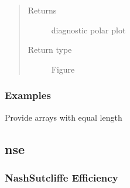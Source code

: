 \documentclass[letterpaper,10pt,english]{sphinxmanual}
\begin{document}
\begin{fulllineitems}
\begin{quote}
\begin{description}
\begin{itemize}
\end{itemize}

\item[{Returns}] \leavevmode
{} \textendash{} diagnostic polar plot

\item[{Return type}] \leavevmode
Figure

\end{description}\end{quote}
\subsubsection*{Examples}

Provide arrays with equal length

\begin{sphinxVerbatim}[commandchars=\\\{\}]
   
   
  \PYG{p}{[}     \PYG{p}{]}
  \PYG{p}{[}     \PYG{p}{]}
 
\end{sphinxVerbatim}

\end{fulllineitems}



\subsection{nse}
\label{\detokenize{reference/nse:nse}}\label{\detokenize{reference/nse::doc}}

\subsubsection{Nash\sphinxhyphen{}Sutcliffe Efficiency}
\label{\detokenize{reference/nse:nash-sutcliffe-efficiency}}
\end{document}
